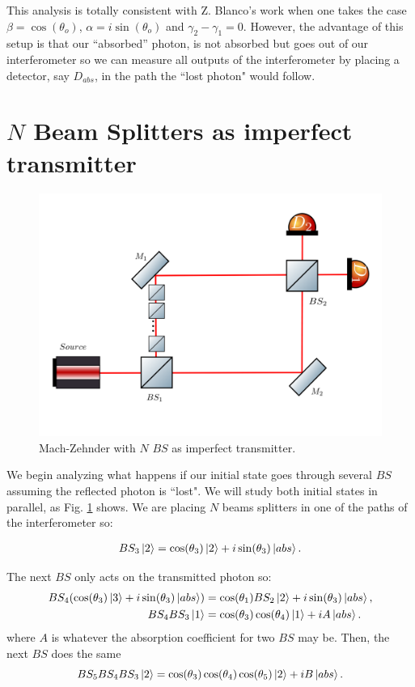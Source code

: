 \documentclass{book}
\begin{document}
This analysis is totally consistent with Z. Blanco's work \cite{zuri,azuri} when one takes the case $\beta=\cos(\theta_{o})$, $\alpha=i \sin(\theta_{o})$ and $\gamma_{2}-\gamma_{1}=0$. However, the advantage of this setup is that our ``absorbed'' photon, is not absorbed but goes out of our interferometer so we can measure all outputs of the interferometer by placing a detector, say $D_{abs}$, in the path the ``lost photon" would follow.

\section{$N$ Beam Splitters as imperfect transmitter }


\begin{figure}[H]
\centering
\includegraphics[width=\linewidth,height=8 cm]{images/machzenhderBSS.png}
\caption{Mach-Zehnder with $N$ $BS$ as imperfect transmitter.}
\label{N_bs}
\end{figure}


We begin analyzing what happens if our initial state goes through several $BS$ assuming the reflected photon is ``lost". We will study both initial states in parallel, as Fig. \ref{N_bs} shows. We are placing $N$ beams splitters in one of the paths of the interferometer so:

\begin{align}
BS_{3}\ket{2}=\cos(\theta_{3})\ket{2}+i\sin(\theta_{3})\ket{abs}.
\end{align}

The next $BS$ only acts on the transmitted photon so:
\begin{align}
BS_{4}(\cos(\theta_{3})\ket{3}+i\sin(\theta_{3})\ket{abs})&=\cos(\theta_{1})BS_{2}\ket{2}+i\sin(\theta_{3})\ket{abs},\\
BS_{4}BS_{3}\ket{1}&=\cos(\theta_{3})\cos(\theta_{4})\ket{1}+i A\ket{abs}.
\end{align}
where $A$ is whatever the absorption coefficient for two $BS$ may be. Then, the next $BS$ does the same
\begin{equation}
BS_{5}BS_{4}BS_{3}\ket{2}=\cos(\theta_{3})\cos(\theta_{4})\cos(\theta_{5})\ket{2}+iB\ket{abs}.
\end{equation}
\end{document}
